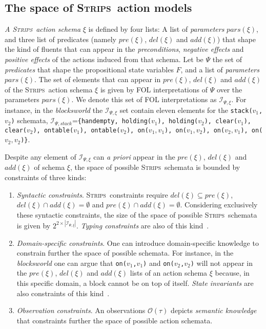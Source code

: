 \documentclass{article}
\newcommand{\strips}{\textsc{Strips}}
\begin{document}
\subsection{The space of \strips\ action models}
{\em A \strips\ action schema} $\xi$ is defined by four lists: A list of {\em parameters} $pars(\xi)$, and three list of predicates (namely $pre(\xi)$, $del(\xi)$ and $add(\xi)$) that shape the kind of fluents that can appear in the {\em preconditions}, {\em negative effects} and {\em positive effects} of the actions induced from that schema. Let be $\Psi$ the set of {\em predicates} that shape the propositional state variables $F$, and a list of {\em parameters} $pars(\xi)$. The set of elements that can appear in $pre(\xi)$, $del(\xi)$ and $add(\xi)$ of the \strips\ action schema $\xi$ is given by FOL interpretations of $\Psi$ over the parameters $pars(\xi)$. We denote this set of FOL interpretations as ${\mathcal I}_{\Psi,\xi}$. For instance, in the {\em blocksworld} the ${\mathcal I}_{\Psi,\xi}$ set contain eleven elements for the {\small \tt stack($v_1$,$v_2$)} schemata, ${\mathcal I}_{\Psi,stack}$={\small\tt\{handempty, holding($v_1$), holding($v_2$), clear($v_1$), clear($v_2$), ontable($v_1$), ontable($v_2$), on($v_1,v_1$), on($v_1,v_2$), on($v_2,v_1$), on($v_2,v_2$)\}}. 

Despite any element of ${\mathcal I}_{\Psi,\xi}$ can {\em a priori} appear in the $pre(\xi)$, $del(\xi)$ and $add(\xi)$ of schema $\xi$, the space of possible \strips\ schemata is bounded by constraints of three kinds:
\begin{enumerate}
\item {\em Syntactic constraints}. \strips\ constraints require $del(\xi)\subseteq pre(\xi)$, $del(\xi)\cap add(\xi)=\emptyset$ and $pre(\xi)\cap add(\xi)=\emptyset$. Considering exclusively these syntactic constraints, the size of the space of possible \strips\ schemata is given by $2^{2\times|{\mathcal I}_{\Psi,\xi}|}$. {\em Typing constraints} are also of this kind~\cite{mcdermott1998pddl}. 
\item {\em Domain-specific constraints}. One can introduce domain-specific knowledge to constrain further the space of possible schemata. For instance, in the {\em blocksworld} one can argue that {\small\tt on($v_1$,$v_1$)} and {\small\tt on($v_2$,$v_2$)} will not appear in the $pre(\xi)$, $del(\xi)$ and $add(\xi)$ lists of an action schema $\xi$ because, in this specific domain, a block cannot be on top of itself. {\it State invariants} are also constraints of this kind~\cite{fox1998automatic}. 
\item {\em Observation constraints}. An observations $\mathcal{O}(\tau)$ depicts {\em semantic knowledge} that constraints further the space of possible action schemata.   
\end{enumerate}
\end{document}
